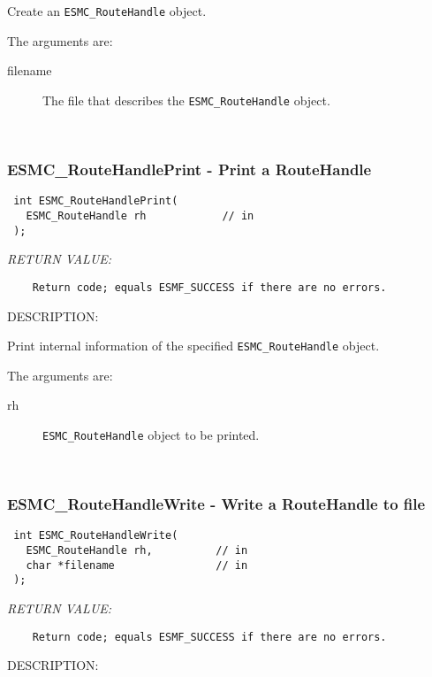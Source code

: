  
    Create an {\tt ESMC\_RouteHandle} object.
  
    The arguments are:
    \begin{description}
    \item[filename] 
      The file that describes the {\tt ESMC\_RouteHandle} object.
    \end{description}
   
 
\mbox{}\hrulefill\ 
 
\subsubsection [ESMC\_RouteHandlePrint] {ESMC\_RouteHandlePrint - Print a RouteHandle}


  
\begin{verbatim} int ESMC_RouteHandlePrint(
   ESMC_RouteHandle rh            // in
 );\end{verbatim}{\em RETURN VALUE:}
\begin{verbatim}    Return code; equals ESMF_SUCCESS if there are no errors.\end{verbatim}
{\sf DESCRIPTION:\\ }


  
    Print internal information of the specified {\tt ESMC\_RouteHandle} object.
  
    The arguments are:
    \begin{description}
    \item[rh] 
      {\tt ESMC\_RouteHandle} object to be printed.
    \end{description}
   
 
\mbox{}\hrulefill\ 
 
\subsubsection [ESMC\_RouteHandleWrite] {ESMC\_RouteHandleWrite - Write a RouteHandle to file}


  
\begin{verbatim} int ESMC_RouteHandleWrite(
   ESMC_RouteHandle rh,          // in
   char *filename                // in
 );\end{verbatim}{\em RETURN VALUE:}
\begin{verbatim}    Return code; equals ESMF_SUCCESS if there are no errors.\end{verbatim}
{\sf DESCRIPTION:\\ }


